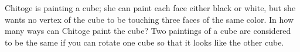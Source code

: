 Chitoge is painting a cube; she can paint each face either black or white, but she wants no vertex of the cube to be touching three faces of the same color. In how many ways can Chitoge paint the cube? Two paintings of a cube are considered to be the same if you can rotate one cube so that it looks like the other cube.